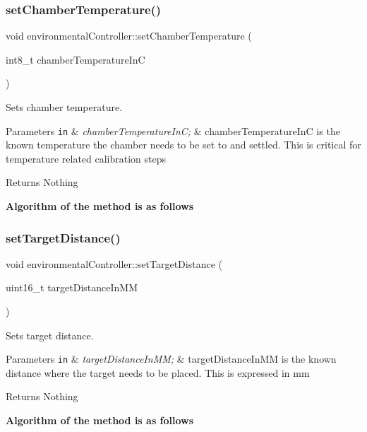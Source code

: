 \subsubsection{\texorpdfstring{set\+Chamber\+Temperature()}{setChamberTemperature()}}
{\footnotesize\ttfamily void environmental\+Controller\+::set\+Chamber\+Temperature (\begin{DoxyParamCaption}\item[{int8\+\_\+t}]{chamber\+Temperature\+InC }\end{DoxyParamCaption})}



Sets chamber temperature. 


\begin{DoxyParams}[1]{Parameters}
\mbox{\tt in}  & {\em chamber\+Temperature\+In\+C;} & chamber\+Temperature\+InC is the known temperature the chamber needs to be set to and settled. This is critical for temperature related calibration steps \\
\hline
\end{DoxyParams}
\begin{DoxyReturn}{Returns}
Nothing 
\end{DoxyReturn}
{\bfseries Algorithm of the method is as follows} \mbox{\label{classenvironmental_controller_a8251b7f25c6a6c5583c718bac664d05b}} 
\subsubsection{\texorpdfstring{set\+Target\+Distance()}{setTargetDistance()}}
{\footnotesize\ttfamily void environmental\+Controller\+::set\+Target\+Distance (\begin{DoxyParamCaption}\item[{uint16\+\_\+t}]{target\+Distance\+In\+MM }\end{DoxyParamCaption})}



Sets target distance. 


\begin{DoxyParams}[1]{Parameters}
\mbox{\tt in}  & {\em target\+Distance\+In\+M\+M;} & target\+Distance\+In\+MM is the known distance where the target needs to be placed. This is expressed in mm \\
\hline
\end{DoxyParams}
\begin{DoxyReturn}{Returns}
Nothing 
\end{DoxyReturn}
{\bfseries Algorithm of the method is as follows}


